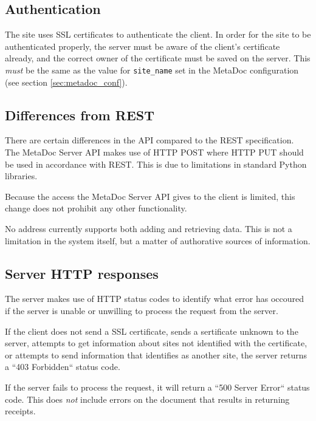 \subsection{Authentication}
\label{sec:authentication}
The site uses SSL certificates to authenticate the client. In order for the
site to be authenticated properly, the server must be aware of the client's
certificate already, and the correct owner of the certificate must be saved on
the server. This \textit{must} be the same as the value for \texttt{site\_name}
set in the MetaDoc configuration (see section \ref{sec:metadoc_conf}).

\subsection{Differences from REST}
\label{sec:diff_from_rest}

There are certain differences in the API compared to the REST specification. The 
MetaDoc Server API makes use of HTTP POST where HTTP PUT should be used in 
accordance with REST. This is due to limitations in standard Python libraries.

Because the access the MetaDoc Server API gives to the client is limited, this 
change does not prohibit any other functionality. 

No address currently supports both adding and retrieving data. This is not a
limitation in the system itself, but a matter of authorative sources of
information. 

\subsection{Server HTTP responses}

The server makes use of HTTP status codes to identify what error has occoured
if the server is unable or unwilling to process the request from the server. 

If the client does not send a SSL certificate, sends a sertificate unknown to 
the server, attempts to get information about sites not identified with the
certificate, or attempts to send information that identifies as another site, 
the server returns a ``403 Forbidden`` status code.

If the server fails to process the request, it will return a ``500 Server
Error`` status code. This does \textit{not} include errors on the document that
results in returning receipts.
